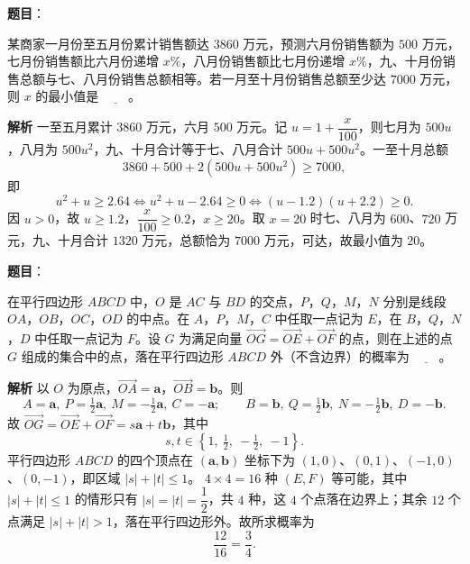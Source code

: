 \begin{answer}

\textbf{题目}：

某商家一月份至五月份累计销售额达 $3860$ 万元，预测六月份销售额为 $500$ 万元，七月份销售额比六月份递增 $x\%$，八月份销售额比七月份递增 $x\%$，九、十月份销售总额与七、八月份销售总额相等。若一月至十月份销售总额至少达 $7000$ 万元，则 $x$ 的最小值是 $\underline{\qquad}$。

\textbf{解析}
一至五月累计 $3860$ 万元，六月 $500$ 万元。记 $u=1+\dfrac x{100}$，则七月为 $500u$，八月为 $500u^2$，九、十月合计等于七、八月合计 $500u+500u^2$。一至十月总额
\nopagebreak[4]
\[3860+500+2\left(500u+500u^2\right)\geqslant7000,\]
即
\nopagebreak[4]
\[u^2+u\geqslant2.64\iff u^2+u-2.64\geqslant0\iff(u-1.2)(u+2.2)\geqslant0.\]
因 $u>0$，故 $u\geqslant1.2$，$\dfrac x{100}\geqslant0.2$，$x\geqslant20$。取 $x=20$ 时七、八月为 $600$、$720$ 万元，九、十月合计 $1320$ 万元，总额恰为 $7000$ 万元，可达，故最小值为 $20$。


\end{answer}
\begin{answer}

\textbf{题目}：

在平行四边形 $ABCD$ 中，$O$ 是 $AC$ 与 $BD$ 的交点，$P$，$Q$，$M$，$N$ 分别是线段 $OA$，$OB$，$OC$，$OD$ 的中点。在 $A$，$P$，$M$，$C$ 中任取一点记为 $E$，在 $B$，$Q$，$N$，$D$ 中任取一点记为 $F$。设 $G$ 为满足向量 $\overrightarrow{OG}=\overrightarrow{OE}+\overrightarrow{OF}$ 的点，则在上述的点 $G$ 组成的集合中的点，落在平行四边形 $ABCD$ 外（不含边界）的概率为 $\underline{\qquad}$。
\nopagebreak[4]
\begin{center}\end{center}
\nopagebreak[4]
\textbf{解析}
以 $O$ 为原点，$\overrightarrow{OA}=\boldsymbol a$，$\overrightarrow{OB}=\boldsymbol b$。则
\nopagebreak[4]
\[A=\boldsymbol a,\ P=\tfrac12\boldsymbol a,\ M=-\tfrac12\boldsymbol a,\ C=-\boldsymbol a;\qquad
B=\boldsymbol b,\ Q=\tfrac12\boldsymbol b,\ N=-\tfrac12\boldsymbol b,\ D=-\boldsymbol b.\]
故 $\overrightarrow{OG}=\overrightarrow{OE}+\overrightarrow{OF}=s\boldsymbol a+t\boldsymbol b$，其中
\nopagebreak[4]
\[s,t\in\left\{1,\ \tfrac12,\ -\tfrac12,\ -1\right\}.\]
平行四边形 $ABCD$ 的四个顶点在 $(\boldsymbol a,\boldsymbol b)$ 坐标下为 $(1,0)$、$(0,1)$、$(-1,0)$、$(0,-1)$，即区域 $|s|+|t|\leqslant1$。
$4\times4=16$ 种 $(E,F)$ 等可能，其中 $|s|+|t|\leqslant1$ 的情形只有 $|s|=|t|=\dfrac12$，共 $4$ 种，这 $4$ 个点落在边界上；其余 $12$ 个点满足 $|s|+|t|>1$，落在平行四边形外。故所求概率为
\nopagebreak[4]
\[\frac{12}{16}=\frac34.\]


\end{answer}
